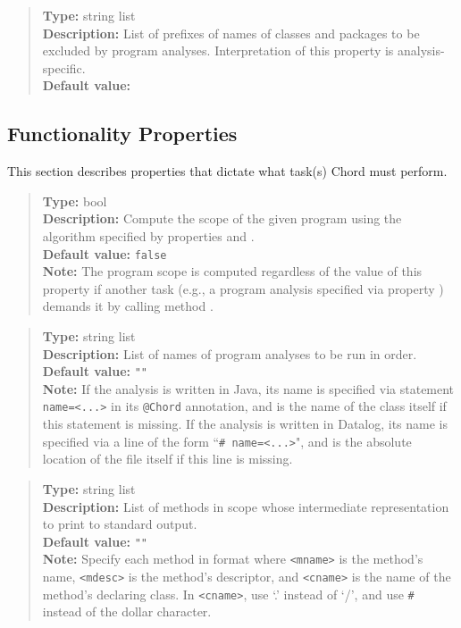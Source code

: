 \begin{quote}
{\bf Type:} string list \\
{\bf Description:} List of prefixes of names of classes and packages to be excluded by program analyses.  Interpretation of this property is analysis-specific. \\
{\bf Default value:} 
\end{quote}

\subsection{Functionality Properties}
\label{sec:func-props}

This section describes properties that dictate what task(s) Chord must perform.
\\[10pt]

\begin{quote}
{\bf Type:} bool \\
{\bf Description:} Compute the scope of the given program using the algorithm specified by properties  and . \\
{\bf Default value:} {\tt false} \\
{\bf Note:} The program scope is computed regardless of the value of this property if another task (e.g., a program analysis specified via property ) demands it by calling method . 
\end{quote}

\begin{quote}
{\bf Type:} string list  \\
{\bf Description:} List of names of program analyses to be run in order. \\
{\bf Default value:} {\tt ""} \\
{\bf Note:} If the analysis is written in Java, its name is specified via statement {\tt name=<...>} in its {\tt @Chord} annotation, and is the name of the class itself if this statement is missing.  If the analysis is written in Datalog, its name is specified via a line of the form ``{\tt \# name=<...>}", and is the absolute location of the file itself if this line is missing. 
\end{quote}

\begin{quote}
{\bf Type:} string list  \\
{\bf Description:} List of methods in scope whose intermediate representation to print to standard output. \\
{\bf Default value:} {\tt ""} \\
{\bf Note:} Specify each method in format  where {\tt <mname>} is the method's name, {\tt <mdesc>} is the method's descriptor, and {\tt <cname>} is the name of the method's declaring class. In {\tt <cname>}, use `.' instead of `/', and use {\tt \#} instead of the dollar character. 
\end{quote}

